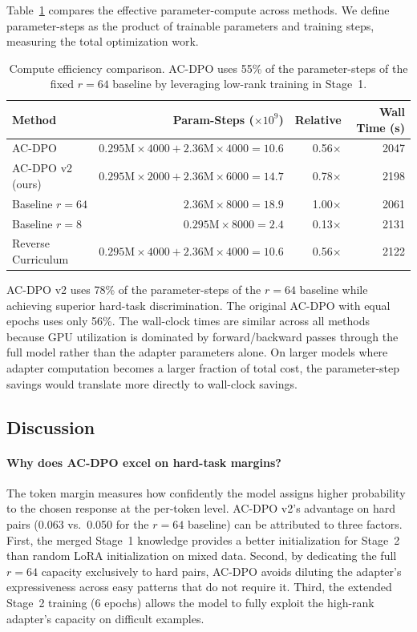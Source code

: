 \documentclass{article}
\begin{document}
Table~\ref{tab:compute} compares the effective parameter-compute across methods. We define parameter-steps as the product of trainable parameters and training steps, measuring the total optimization work.

\begin{table}[h]
\caption{Compute efficiency comparison. AC-DPO uses 55\% of the parameter-steps of the fixed $r{=}64$ baseline by leveraging low-rank training in Stage~1.}
\label{tab:compute}
\centering
\small
\begin{tabular}{l rrr}
\toprule
\textbf{Method} & \textbf{Param-Steps ($\times 10^9$)} & \textbf{Relative} & \textbf{Wall Time (s)} \\
\midrule
AC-DPO            & $0.295\text{M} \times 4000 + 2.36\text{M} \times 4000 = 10.6$ & 0.56$\times$ & 2047 \\
AC-DPO v2 (ours)  & $0.295\text{M} \times 2000 + 2.36\text{M} \times 6000 = 14.7$ & 0.78$\times$ & 2198 \\
Baseline $r{=}64$ & $2.36\text{M} \times 8000 = 18.9$ & 1.00$\times$ & 2061 \\
Baseline $r{=}8$  & $0.295\text{M} \times 8000 = 2.4$ & 0.13$\times$ & 2131 \\
Reverse Curriculum & $0.295\text{M} \times 4000 + 2.36\text{M} \times 4000 = 10.6$ & 0.56$\times$ & 2122 \\
\bottomrule
\end{tabular}
\end{table}

AC-DPO v2 uses 78\% of the parameter-steps of the $r{=}64$ baseline while achieving superior hard-task discrimination. The original AC-DPO with equal epochs uses only 56\%. The wall-clock times are similar across all methods because GPU utilization is dominated by forward/backward passes through the full model rather than the adapter parameters alone. On larger models where adapter computation becomes a larger fraction of total cost, the parameter-step savings would translate more directly to wall-clock savings.

\subsection{Discussion}

\paragraph{Why does AC-DPO excel on hard-task margins?}
The token margin measures how confidently the model assigns higher probability to the chosen response at the per-token level. AC-DPO v2's advantage on hard pairs (0.063 vs.\ 0.050 for the $r{=}64$ baseline) can be attributed to three factors. First, the merged Stage~1 knowledge provides a better initialization for Stage~2 than random LoRA initialization on mixed data. Second, by dedicating the full $r{=}64$ capacity exclusively to hard pairs, AC-DPO avoids diluting the adapter's expressiveness across easy patterns that do not require it. Third, the extended Stage~2 training (6 epochs) allows the model to fully exploit the high-rank adapter's capacity on difficult examples.
\end{document}
